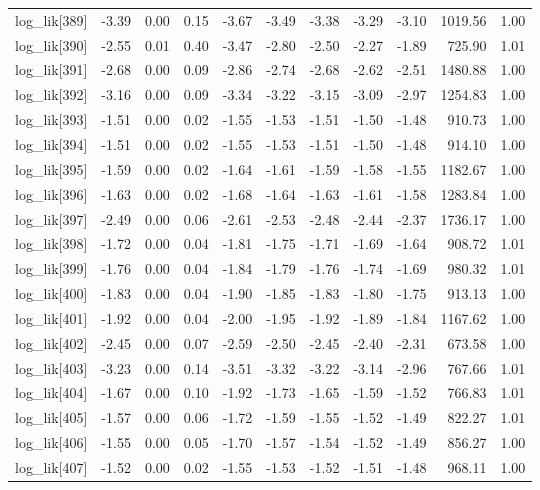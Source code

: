 \begin{table}[ht]
\begin{tabular}{rrrrrrrrrrr}
  log\_lik[389] & -3.39 & 0.00 & 0.15 & -3.67 & -3.49 & -3.38 & -3.29 & -3.10 & 1019.56 & 1.00 \\ 
  log\_lik[390] & -2.55 & 0.01 & 0.40 & -3.47 & -2.80 & -2.50 & -2.27 & -1.89 & 725.90 & 1.01 \\ 
  log\_lik[391] & -2.68 & 0.00 & 0.09 & -2.86 & -2.74 & -2.68 & -2.62 & -2.51 & 1480.88 & 1.00 \\ 
  log\_lik[392] & -3.16 & 0.00 & 0.09 & -3.34 & -3.22 & -3.15 & -3.09 & -2.97 & 1254.83 & 1.00 \\ 
  log\_lik[393] & -1.51 & 0.00 & 0.02 & -1.55 & -1.53 & -1.51 & -1.50 & -1.48 & 910.73 & 1.00 \\ 
  log\_lik[394] & -1.51 & 0.00 & 0.02 & -1.55 & -1.53 & -1.51 & -1.50 & -1.48 & 914.10 & 1.00 \\ 
  log\_lik[395] & -1.59 & 0.00 & 0.02 & -1.64 & -1.61 & -1.59 & -1.58 & -1.55 & 1182.67 & 1.00 \\ 
  log\_lik[396] & -1.63 & 0.00 & 0.02 & -1.68 & -1.64 & -1.63 & -1.61 & -1.58 & 1283.84 & 1.00 \\ 
  log\_lik[397] & -2.49 & 0.00 & 0.06 & -2.61 & -2.53 & -2.48 & -2.44 & -2.37 & 1736.17 & 1.00 \\ 
  log\_lik[398] & -1.72 & 0.00 & 0.04 & -1.81 & -1.75 & -1.71 & -1.69 & -1.64 & 908.72 & 1.01 \\ 
  log\_lik[399] & -1.76 & 0.00 & 0.04 & -1.84 & -1.79 & -1.76 & -1.74 & -1.69 & 980.32 & 1.01 \\ 
  log\_lik[400] & -1.83 & 0.00 & 0.04 & -1.90 & -1.85 & -1.83 & -1.80 & -1.75 & 913.13 & 1.00 \\ 
  log\_lik[401] & -1.92 & 0.00 & 0.04 & -2.00 & -1.95 & -1.92 & -1.89 & -1.84 & 1167.62 & 1.00 \\ 
  log\_lik[402] & -2.45 & 0.00 & 0.07 & -2.59 & -2.50 & -2.45 & -2.40 & -2.31 & 673.58 & 1.00 \\ 
  log\_lik[403] & -3.23 & 0.00 & 0.14 & -3.51 & -3.32 & -3.22 & -3.14 & -2.96 & 767.66 & 1.01 \\ 
  log\_lik[404] & -1.67 & 0.00 & 0.10 & -1.92 & -1.73 & -1.65 & -1.59 & -1.52 & 766.83 & 1.01 \\ 
  log\_lik[405] & -1.57 & 0.00 & 0.06 & -1.72 & -1.59 & -1.55 & -1.52 & -1.49 & 822.27 & 1.01 \\ 
  log\_lik[406] & -1.55 & 0.00 & 0.05 & -1.70 & -1.57 & -1.54 & -1.52 & -1.49 & 856.27 & 1.00 \\ 
  log\_lik[407] & -1.52 & 0.00 & 0.02 & -1.55 & -1.53 & -1.52 & -1.51 & -1.48 & 968.11 & 1.00 \\ 

\end{tabular}
\end{table}
